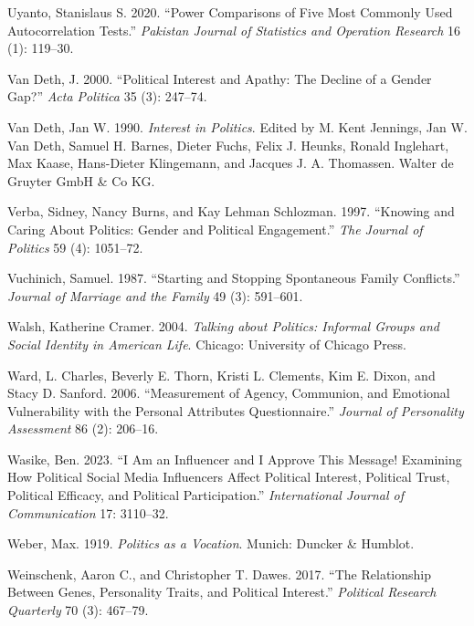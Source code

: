 \documentclass[
  letterpaper,
  DIV=11,
  numbers=noendperiod]{scrreprt}
\newlength{\cslhangindent}
\newenvironment{CSLReferences}[2] %
 {\begin{list}{}{%
  \setlength{\itemindent}{0pt}
  \setlength{\leftmargin}{0pt}
  \setlength{\parsep}{0pt}
  \ifodd #1
   \setlength{\leftmargin}{\cslhangindent}
   \setlength{\itemindent}{-1\cslhangindent}
  \fi
  \setlength{\itemsep}{#2\baselineskip}}}
 {\end{list}}
\begin{document}
\begin{CSLReferences}{1}{0}
Uyanto, Stanislaus S. 2020. {``{Power Comparisons of Five Most Commonly
Used Autocorrelation Tests}.''} \emph{Pakistan Journal of Statistics and
Operation Research} 16 (1): 119--30.

Van Deth, J. 2000. {``{Political Interest and Apathy: The Decline of a
Gender Gap?}''} \emph{Acta Politica} 35 (3): 247--74.

Van Deth, Jan W. 1990. \emph{Interest in Politics}. Edited by M. Kent
Jennings, Jan W. Van Deth, Samuel H. Barnes, Dieter Fuchs, Felix J.
Heunks, Ronald Inglehart, Max Kaase, Hans-Dieter Klingemann, and Jacques
J. A. Thomassen. Walter de Gruyter GmbH \& Co KG.

Verba, Sidney, Nancy Burns, and Kay Lehman Schlozman. 1997. {``{Knowing
and Caring About Politics: Gender and Political Engagement}.''}
\emph{The Journal of Politics} 59 (4): 1051--72.

Vuchinich, Samuel. 1987. {``{Starting and Stopping Spontaneous Family
Conflicts}.''} \emph{Journal of Marriage and the Family} 49 (3):
591--601.

Walsh, Katherine Cramer. 2004. \emph{{Talking about Politics: Informal
Groups and Social Identity in American Life}}. Chicago: University of
Chicago Press.

Ward, L. Charles, Beverly E. Thorn, Kristi L. Clements, Kim E. Dixon,
and Stacy D. Sanford. 2006. {``{Measurement of Agency, Communion, and
Emotional Vulnerability with the Personal Attributes Questionnaire}.''}
\emph{Journal of Personality Assessment} 86 (2): 206--16.

Wasike, Ben. 2023. {``{I Am an Influencer and I Approve This Message!
Examining How Political Social Media Influencers Affect Political
Interest, Political Trust, Political Efficacy, and Political
Participation}.''} \emph{International Journal of Communication} 17:
3110--32.

Weber, Max. 1919. \emph{{Politics as a Vocation}}. Munich: Duncker \&
Humblot.

Weinschenk, Aaron C., and Christopher T. Dawes. 2017. {``{The
Relationship Between Genes, Personality Traits, and Political
Interest}.''} \emph{Political Research Quarterly} 70 (3): 467--79.


\end{CSLReferences}
\end{document}
